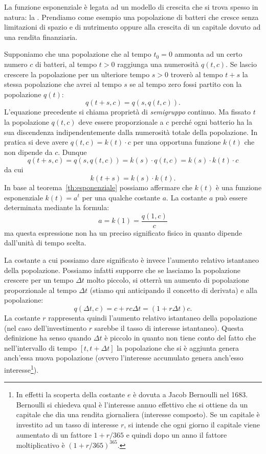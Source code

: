 La funzione esponenziale è legata ad un modello di crescita che si trova spesso
in natura: la .
Prendiamo come esempio una popolazione di batteri che cresce senza
limitazioni di spazio e di nutrimento oppure
alla crescita di un capitale dovuto ad una rendita finanziaria.

Supponiamo che una popolazione che al tempo $t_0=0$
ammonta ad un certo numero $c$ di batteri, al tempo
$t>0$ raggiunga una numerosità $q(t,c)$.
Se lascio crescere la popolazione per un ulteriore
tempo $s>0$ troverò al tempo $t+s$ la stessa
popolazione che avrei al tempo $s$ se al tempo
zero fossi partito con la popolazione $q(t)$:
\[
  q(t+s,c) = q(s,q(t,c)).
\]
L'equazione precedente si chiama proprietà
di \emph{semigruppo}
%
continuo.
Ma fissato $t$ la popolazione $q(t,c)$ deve
essere proporzionale a $c$ perché ogni batterio
ha la sua discendenza indipendentemente dalla numerosità
totale della popolazione. In pratica
si deve avere $q(t,c) = k(t) \cdot c$ per una opportuna
funzione $k(t)$ che non dipende da $c$.
Dunque
\[
  q(t+s,c)
  = q(s,q(t,c))
  = k(s) \cdot q(t,c)
  = k(s) \cdot k(t) \cdot c
\]
da cui
\[
  k(t+s) = k(s) \cdot k(t).
\]
In base al teorema~\ref{th:esponenziale}
possiamo affermare
che $k(t)$ è una funzione esponenziale $k(t)=a^t$
per una qualche costante $a$.
La costante $a$ può essere determinata mediante la formula:
\[
  a = k(1) = \frac{q(1,c)}{c}
\]
ma questa espressione non ha un preciso significato fisico in quanto
dipende dall'unità di tempo scelta.

La costante a cui possiamo dare significato è invece l'aumento relativo
istantaneo della popolazione. Possiamo infatti supporre che
se lasciamo la popolazione crescere per un tempo $\Delta t$ molto piccolo,
si otterrà un aumento di popolazione proporzionale al tempo $\Delta t$
(stiamo qui anticipando il concetto di derivata) e alla popolazione:
\begin{equation}\label{eq:488464}
  q(\Delta t,c) = c + r c \Delta t = (1+r \Delta t) c.
\end{equation}
La costante $r$ rappresenta quindi l'aumento
relativo istantaneo della popolazione (nel caso dell'investimento
$r$ sarebbe il tasso di interesse istantaneo).
Questa definizione ha senso
quando $\Delta t$ è piccolo in quanto non tiene conto del fatto che
nell'intervallo di tempo $[t,t+\Delta t]$ la popolazione che si
è aggiunta genera anch'essa nuova popolazione (ovvero l'interesse
accumulato genera anch'esso interesse\footnote{%
In effetti la scoperta della costante $e$
è dovuta a Jacob Bernoulli nel 1683.
Bernoulli si chiedeva qual è l'interesse annuo effettivo
che si ottiene da un capitale che dia una rendita
giornaliera (interesse composto).
Se un capitale è investito ad un tasso di interesse $r$,
si intende che ogni giorno il capitale
viene aumentato di un fattore $1+r/365$
e quindi dopo un anno il fattore moltiplicativo è $(1+r/365)^365$.
}).

